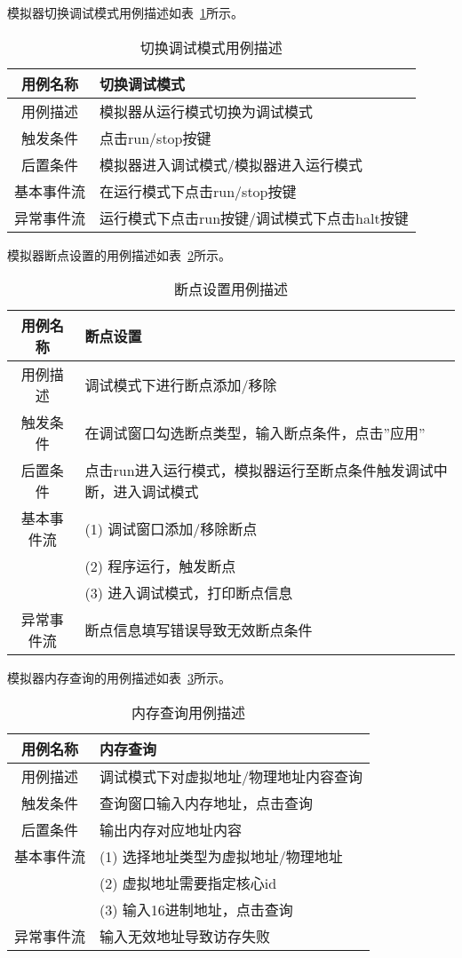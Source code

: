 模拟器切换调试模式用例描述如表~\ref{tab:yongli2}所示。
\begin{table}[h]
  \centering
  \caption{切换调试模式用例描述}
  \label{tab:yongli2}
  \begin{tabular}{cl}
    \toprule
用例名称	& 切换调试模式\\
    \midrule
用例描述	& 模拟器从运行模式切换为调试模式\\
触发条件	& 点击run/stop按键\\
后置条件	& 模拟器进入调试模式/模拟器进入运行模式\\
基本事件流	& 在运行模式下点击run/stop按键\\
异常事件流	& 运行模式下点击run按键/调试模式下点击halt按键\\
    \bottomrule
  \end{tabular}
\end{table}


模拟器断点设置的用例描述如表~\ref{tab:yongli3}所示。
\begin{table}[h]
  \centering
  \caption{断点设置用例描述}
  \label{tab:yongli3}
  \begin{tabular}{cl}
    \toprule
用例名称	& 断点设置\\
    \midrule
用例描述	& 调试模式下进行断点添加/移除\\
触发条件	& 在调试窗口勾选断点类型，输入断点条件，点击”应用”\\
后置条件	& 点击run进入运行模式，模拟器运行至断点条件触发调试中断，进入调试模式\\
基本事件流	& (1)	调试窗口添加/移除断点\\
 & (2)	程序运行，触发断点\\
 & (3)	进入调试模式，打印断点信息\\
异常事件流	& 断点信息填写错误导致无效断点条件\\
    \bottomrule
  \end{tabular}
\end{table}


模拟器内存查询的用例描述如表~\ref{tab:yongli4}所示。
\begin{table}[h]
  \centering
  \caption{内存查询用例描述}
  \label{tab:yongli4}
  \begin{tabular}{cl}
    \toprule
用例名称	& 内存查询\\
    \midrule
用例描述	& 调试模式下对虚拟地址/物理地址内容查询\\
触发条件	& 查询窗口输入内存地址，点击查询\\
后置条件	& 输出内存对应地址内容\\
基本事件流	& (1) 选择地址类型为虚拟地址/物理地址\\
 &            (2) 虚拟地址需要指定核心id\\
 &            (3) 输入16进制地址，点击查询\\
异常事件流	& 输入无效地址导致访存失败\\
    \bottomrule
  \end{tabular}
\end{table}


